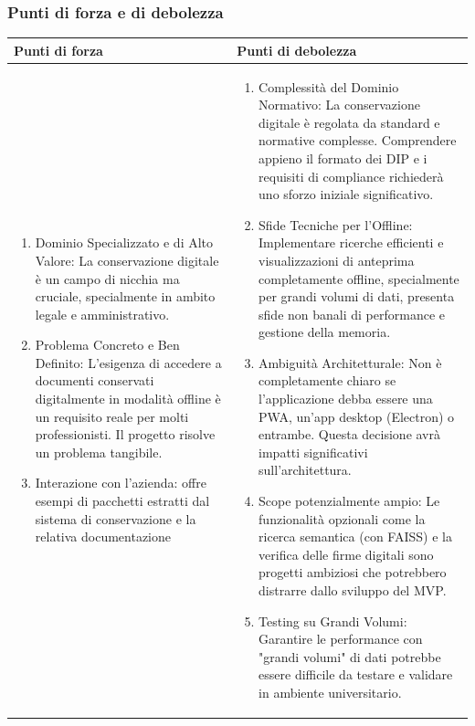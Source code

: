 \documentclass[a4paper,11pt]{article}
\begin{document}
\subsubsection{Punti di forza e di debolezza}
{\footnotesize
\begin{tabularx}{\textwidth}{|X|X|}
\hline
\rowcolor{lightgray!40} %
\textbf{Punti di forza} & \textbf{Punti di debolezza} \\
\hline
\begin{enumerate}
\item Dominio Specializzato e di Alto Valore: La conservazione digitale è un campo di nicchia ma cruciale, specialmente in ambito legale e amministrativo.
\item Problema Concreto e Ben Definito: L'esigenza di accedere a documenti conservati digitalmente in modalità offline è un requisito reale per molti professionisti. Il progetto risolve un problema tangibile.
\item Interazione con l'azienda: offre esempi di pacchetti estratti dal sistema di conservazione e la relativa documentazione
\end{enumerate}
 & \begin{enumerate}
\item Complessità del Dominio Normativo: La conservazione digitale è regolata da standard e normative complesse. Comprendere appieno il formato dei DIP e i requisiti di compliance richiederà uno sforzo iniziale significativo.
\item Sfide Tecniche per l'Offline: Implementare ricerche efficienti e visualizzazioni di anteprima completamente offline, specialmente per grandi volumi di dati, presenta sfide non banali di performance e gestione della memoria.

\item Ambiguità Architetturale: Non è completamente chiaro se l'applicazione debba essere una PWA, un'app desktop (Electron) o entrambe. Questa decisione avrà impatti significativi sull'architettura.
\item Scope potenzialmente ampio: Le funzionalità opzionali come la ricerca semantica (con FAISS) e la verifica delle firme digitali sono progetti ambiziosi che potrebbero distrarre dallo sviluppo del MVP.
\item Testing su Grandi Volumi: Garantire le performance con "grandi volumi" di dati potrebbe essere difficile da testare e validare in ambiente universitario.
\end{enumerate} \\
\hline
\end{tabularx}
}
\end{document}

